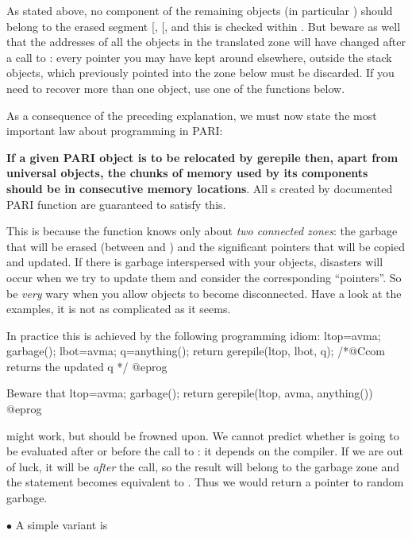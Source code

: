 As stated above, no component of the remaining objects (in particular
) should belong to the erased segment [, [, and
this is checked within . But beware as well that the addresses
of all the objects in the translated zone will have changed after a call to
: every pointer you may have kept around elsewhere, outside the
stack objects, which previously pointed into the zone below 
must be discarded. If you need to recover more than one object, use one of
the  functions below.

As a consequence of the preceding explanation, we must now state the most
important law about programming in PARI:

{\bf If a given PARI object is to be relocated by \hbox{gerepile} then,
apart from universal objects, the chunks of memory used by its components
should be in consecutive memory locations}. All s created by
documented PARI function are guaranteed to satisfy this.

This is because the  function knows only about \emph{two
connected zones}: the garbage that will be erased (between  and
) and the  significant pointers that will be copied and updated.
If there is garbage interspersed with your objects, disasters will occur when
we try to update them and consider the corresponding ``pointers''. So be
\emph{very} wary when you allow objects to become disconnected. Have a look
at the examples, it is not as complicated as it seems.

\noindent In practice this is achieved by the following programming idiom:
\bprog
  ltop=avma; garbage(); lbot=avma; q=anything();
  return gerepile(ltop, lbot, q); /*@Ccom returns the updated q */
@eprog

\noindent Beware that
\bprog
  ltop=avma; garbage();
  return gerepile(ltop, avma, anything())
@eprog

\noindent might work, but should be frowned upon. We cannot predict whether
 is going to be evaluated after or before the call to
: it depends on the compiler. If we are out of luck, it will
be \emph{after} the call, so the result will belong to the garbage zone and
the  statement becomes equivalent to . Thus we
would return a pointer to random garbage.

\noindent$\bullet$ A simple variant is



